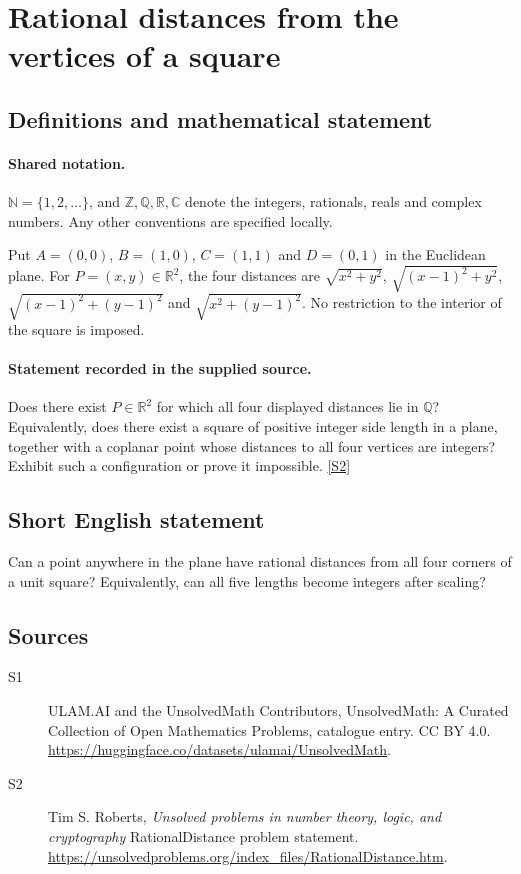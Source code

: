\documentclass[11pt]{article}
\newcommand{\sref}[2]{\hyperlink{source:#1:#2}{[S#2]}}
\begin{document}
\section{Rational distances from the vertices of a square}\label{statement}

\subsection{Definitions and mathematical statement}

\paragraph{Shared notation.}$\mathbb N=\{1,2,\ldots\}$, and $\mathbb Z,\mathbb Q,\mathbb R,\mathbb C$ denote the integers, rationals, reals and complex numbers. Any other conventions are specified locally.


Put $A=(0,0)$, $B=(1,0)$, $C=(1,1)$ and $D=(0,1)$ in the Euclidean plane. For $P=(x,y)\in\mathbb R^2$, the four distances are $\sqrt{x^2+y^2}$, $\sqrt{(x-1)^2+y^2}$, $\sqrt{(x-1)^2+(y-1)^2}$ and $\sqrt{x^2+(y-1)^2}$. No restriction to the interior of the square is imposed.
\paragraph{Statement recorded in the supplied source.}
Does there exist $P\in\mathbb R^2$ for which all four displayed distances lie in $\mathbb Q$? Equivalently, does there exist a square of positive integer side length in a plane, together with a coplanar point whose distances to all four vertices are integers? Exhibit such a configuration or prove it impossible. \sref{statement}{2}
\subsection{Short English statement}
Can a point anywhere in the plane have rational distances from all four corners of a unit square? Equivalently, can all five lengths become integers after scaling?
\subsection{Sources}
\begin{description}
\item[\hypertarget{source:statement:1}{S1}] ULAM.AI and the UnsolvedMath Contributors, UnsolvedMath: A Curated Collection of Open Mathematics Problems, catalogue entry. CC BY 4.0. \url{https://huggingface.co/datasets/ulamai/UnsolvedMath}.
\item[\hypertarget{source:statement:2}{S2}] Tim S. Roberts, \emph{Unsolved problems in number theory, logic, and cryptography} RationalDistance problem statement. \url{https://unsolvedproblems.org/index_files/RationalDistance.htm}.
\end{description}
\label{end:statement}
\end{document}
